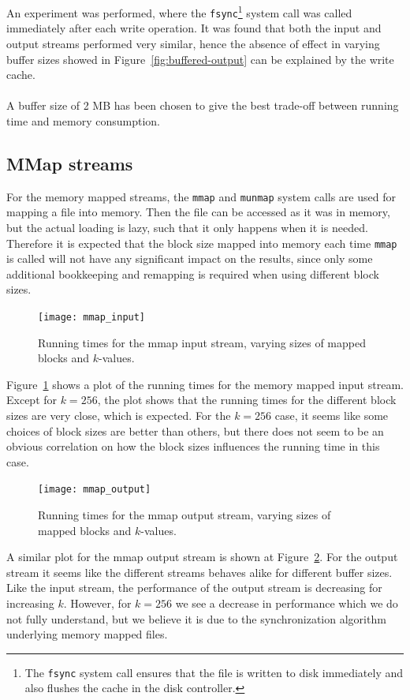 \documentclass[a4paper,12pt]{article}
\begin{document}
An experiment was performed, where the
\texttt{fsync}\footnote{The \texttt{fsync} system call ensures
  that the file is written to disk immediately and also flushes the cache in the disk controller.} system call was
called immediately after each write operation. It was found that both
the input and output streams performed very similar, hence the absence
of effect in varying buffer sizes showed in
Figure~\ref{fig:buffered-output} can be explained by the write cache.
\\
\\
A buffer size of 2 MB has been chosen to give the best trade-off
between running time and memory consumption.

\subsection{MMap streams}
For the memory mapped streams, the \texttt{mmap} and \texttt{munmap}
system calls are used for mapping a file into memory. Then the file
can be accessed as it was in memory, but the actual loading
is lazy, such that it only happens when it is needed.
Therefore it is expected that the block size mapped into memory each
time \texttt{mmap} is called will not have any significant impact on
the results, since only some additional bookkeeping and remapping is required when using different block sizes.

\begin{figure}[h!]
  \centering
  \texttt{[image: mmap\_input]}
  \caption{Running times for the mmap input stream, varying sizes of
    mapped blocks and $k$-values.}
  \label{fig:mmap-input}
\end{figure}

Figure~\ref{fig:mmap-input} shows a plot of the running times for the
memory mapped input stream. Except for $k = 256$, the plot shows
that the running times for the different block sizes are very close,
which is expected. For the $k = 256$ case, it seems like some choices
of block sizes are better than others, but there does not seem to be an
obvious correlation on how the block sizes influences the running time
in this case.

\begin{figure}[h!]
  \centering
  \texttt{[image: mmap\_output]}
  \caption{Running times for the mmap output stream, varying sizes of
    mapped blocks and $k$-values.}
  \label{fig:mmap-output}
\end{figure}

A similar plot for the mmap output stream is shown at
Figure~\ref{fig:mmap-output}. For the output stream it seems like the
different streams behaves alike for different buffer sizes. Like the
input stream, the performance of the output stream is decreasing for
increasing $k$. However, for $k=256$ we see a decrease in performance which we do not fully understand, but we believe it is due to the synchronization algorithm underlying memory mapped files.
\end{document}
